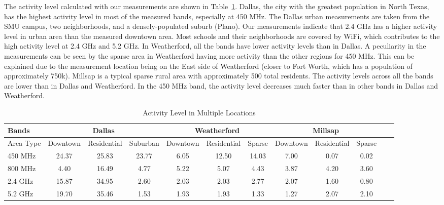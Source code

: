 The activity level calculated with our measurements are shown in Table~\ref{tab:activitymeasurement}. Dallas, the 
city with the greatest population in North Texas, has the highest activity level in most of the measured bands, 
especially at 450 MHz. The Dallas urban measurements are taken from the SMU campus, two neighborhoods, and a 
densely-populated suburb (Plano). Our measurements indicate that 2.4 GHz has a higher activity level in urban area 
than the measured downtown area. Most schools and their neighborhoods are covered by WiFi, which contributes to the 
high activity level at 2.4 GHz and 5.2 GHz. In Weatherford, all the bands have lower activity levels than in Dallas. 
A peculiarity in the measurements can be seen by the sparse area in Weatherford having more activity than the other 
regions for 450 MHz. This can be explained due to the measurement location being on the East side of Weatherford (closer 
to Fort Worth, which has a population of approximately 750k). Millsap is a typical sparse rural area with approximately 
500 total residents. The activity levels across all the bands are lower than in Dallas and Weatherford. In the 450 MHz 
band, the activity level decreases much faster than in other bands in Dallas and Weatherford. 

\begin{table}
\centering %
\begin{tabular}{|l|c|c|c|c|c|c|c|c|c|c|c|} %
\hline %
Bands     & \multicolumn{3}{c|}{Dallas} & \multicolumn{3}{c|}{Weatherford} & \multicolumn{3}{c|}{Millsap} \\%
\hline %
Area Type & Downtown & Residential & Suburban & Downtown &  Residential & Sparse & Downtown & Residential & Sparse \\ %
\hline %
450 MHz &24.37	&25.83  &23.77	&6.05 &12.50  &14.03 & 7.00 & 0.07 & 0.02 \\      
\hline %
800 MHz &4.40 	&16.49  &4.77	&5.22&5.07 &4.43  & 3.87 & 4.20 & 3.60 \\      
\hline %
2.4 GHz &15.87 	&34.95  &2.60	&2.03&2.03 &2.77  & 2.07 & 1.60 & 0.80 \\      
\hline %
5.2 GHz &19.70	&35.46  &1.53	&1.93&1.93 &1.33  & 1.27 & 2.07 & 2.10 \\      
\hline %
\end{tabular}    
\caption{Activity Level in Multiple Locations} %
\label{tab:activitymeasurement}    
\vspace{-0.3in}
\end{table}    


